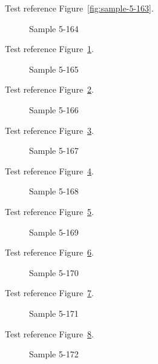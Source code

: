 Test reference Figure~\ref{fig:sample-5-163}.

\begin{figure}[tbhp]
\caption{Sample 5-164}
\label{fig:sample-5-164}
\end{figure}

Test reference Figure~\ref{fig:sample-5-164}.

\begin{figure}[tbhp]
\caption{Sample 5-165}
\label{fig:sample-5-165}
\end{figure}

Test reference Figure~\ref{fig:sample-5-165}.

\begin{figure}[tbhp]
\caption{Sample 5-166}
\label{fig:sample-5-166}
\end{figure}

Test reference Figure~\ref{fig:sample-5-166}.

\begin{figure}[tbhp]
\caption{Sample 5-167}
\label{fig:sample-5-167}
\end{figure}

Test reference Figure~\ref{fig:sample-5-167}.

\begin{figure}[tbhp]
\caption{Sample 5-168}
\label{fig:sample-5-168}
\end{figure}

Test reference Figure~\ref{fig:sample-5-168}.

\begin{figure}[tbhp]
\caption{Sample 5-169}
\label{fig:sample-5-169}
\end{figure}

Test reference Figure~\ref{fig:sample-5-169}.

\begin{figure}[tbhp]
\caption{Sample 5-170}
\label{fig:sample-5-170}
\end{figure}

Test reference Figure~\ref{fig:sample-5-170}.

\begin{figure}[tbhp]
\caption{Sample 5-171}
\label{fig:sample-5-171}
\end{figure}

Test reference Figure~\ref{fig:sample-5-171}.

\begin{figure}[tbhp]
\caption{Sample 5-172}
\label{fig:sample-5-172}
\end{figure}

